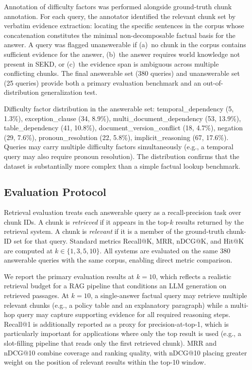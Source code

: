 \documentclass[11pt, a4paper]{article}
\begin{document}
Annotation of difficulty factors was performed alongside ground-truth chunk annotation. For each query, the annotator identified the relevant chunk set by verbatim evidence extraction: locating the specific sentences in the corpus whose concatenation constitutes the minimal non-decomposable factual basis for the answer. A query was flagged unanswerable if (a)~no chunk in the corpus contains sufficient evidence for the answer, (b)~the answer requires world knowledge not present in SEKD, or (c)~the evidence span is ambiguous across multiple conflicting chunks. The final answerable set (380 queries) and unanswerable set (25 queries) provide both a primary evaluation benchmark and an out-of-distribution generalization test.

Difficulty factor distribution in the answerable set: temporal\_dependency (5, 1.3\%), exception\_clause (34, 8.9\%), multi\_document\_dependency (53, 13.9\%), table\_dependency (41, 10.8\%), document\_version\_conflict (18, 4.7\%), negation (29, 7.6\%), pronoun\_resolution (22, 5.8\%), implicit\_reasoning (67, 17.6\%). Queries may carry multiple difficulty factors simultaneously (e.g., a temporal query may also require pronoun resolution). The distribution confirms that the dataset is substantially more complex than a simple factual lookup benchmark.

\subsection{Evaluation Protocol}

Retrieval evaluation treats each answerable query as a recall-precision task over chunk IDs. A chunk is \emph{retrieved} if it appears in the top-$k$ results returned by the retrieval system. A chunk is \emph{relevant} if it is a member of the ground-truth chunk-ID set for that query. Standard metrics Recall@K, MRR, nDCG@K, and Hit@K are computed at $k \in \{1, 3, 5, 10\}$. All systems are evaluated on the same 380 answerable queries with the same corpus, enabling direct metric comparison.

We report the primary evaluation results at $k=10$, which reflects a realistic retrieval budget for a RAG pipeline that conditions an LLM generation on retrieved passages. At $k=10$, a single-answer factual query may retrieve multiple relevant chunks (e.g., a policy table and an explanatory paragraph) while a multi-hop query may capture supporting evidence for all required reasoning steps. Recall@1 is additionally reported as a proxy for precision-at-top-1, which is particularly important for applications where only the top result is used (e.g., a slot-filling pipeline that reads only the first retrieved chunk). MRR and nDCG@10 combine coverage and ranking quality, with nDCG@10 placing greater weight on the position of relevant results within the top-10 window.
\end{document}
